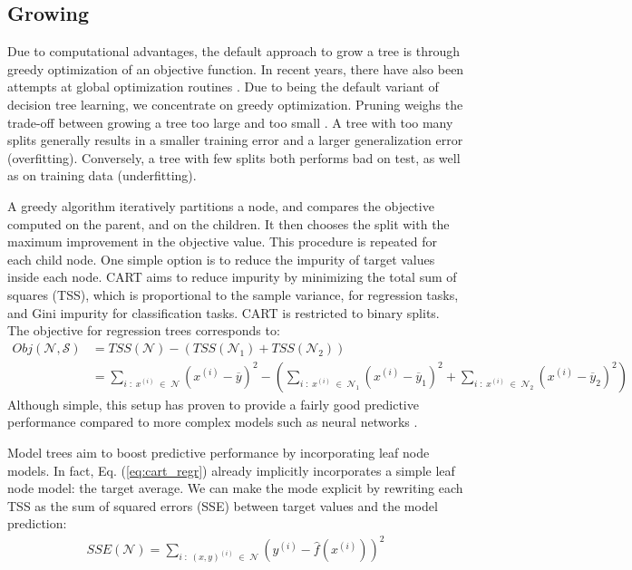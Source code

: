 \documentclass[a4paper, 11pt]{article}
\newcommand{\Node}{\mathcal{N}}
\newcommand{\Split}{\mathcal{S}}
\begin{document}
\subsection{Growing}

Due to computational advantages, the default approach to grow a tree is through greedy optimization of an objective function. In recent years, there have also been attempts at global optimization routines \cite{norouzi_nongreedy_tree}. Due to being the default variant of decision tree learning, we concentrate on greedy optimization. Pruning weighs the trade-off between growing a tree too large and too small \cite{hastie_elemstatlearn}. A tree with too many splits generally results in a smaller training error and a larger generalization error (overfitting). Conversely, a tree with few splits both performs bad on test, as well as on training data (underfitting). 
\par
A greedy algorithm iteratively partitions a node, and compares the objective computed on the parent, and on the children. It then chooses the split with the maximum improvement in the objective value. This procedure is repeated for each child node. One simple option is to reduce the impurity of target values inside each node. CART aims to reduce impurity by minimizing the total sum of squares (TSS), which is proportional to the sample variance, for regression tasks, and Gini impurity for classification tasks. CART is restricted to binary splits. The objective for regression trees corresponds to:
\begin{align}
Obj(\Node, \Split) &= TSS(\Node) - (TSS(\Node_1) + TSS(\Node_2)) \nonumber \\
 &= \sum_{i \;:\; x^{(i)} \;\in\; \Node} \left(x^{(i)} - \overline{y}\right)^2 - \left(\sum_{i \;:\; x^{(i)} \;\in\; \Node_1} \left(x^{(i)} - \overline{y}_1\right)^2 + \sum_{i \;:\; x^{(i)} \;\in\; \Node_2} \left(x^{(i)} - \overline{y}_2\right)^2 \right)
\label{eq:cart_regr}
\end{align}
Although simple, this setup has proven to provide a fairly good predictive performance compared to more complex models such as neural networks \cite{razi_cart_comparison}. 
\par
Model trees aim to boost predictive performance by incorporating leaf node models. In fact, Eq. (\ref{eq:cart_regr}) already implicitly incorporates a simple leaf node model: the target average. We can make the mode explicit by rewriting each TSS as the sum of squared errors (SSE) between target values and the model prediction:
\begin{align*}
SSE(\Node) = \sum_{i \;:\; (x, y)^{(i)} \;\in\; \Node} \left(y^{(i)} - \widehat{f}(x^{(i)})\right)^2
\end{align*}
\end{document}
